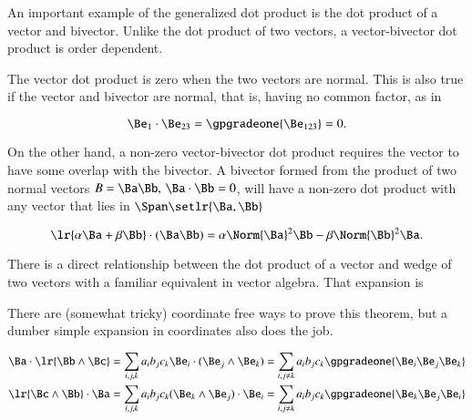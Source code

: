 

An important example of the generalized dot product is the dot product of a vector and bivector.
Unlike the dot product of two vectors, a vector-bivector dot product is order dependent.

The vector dot product is zero when the two vectors are normal.
This is also true if the vector and bivector are normal, that is, having no common factor, as in

\begin{equation}\label{eqn:generalizedDot:661}
\Be_1 \cdot \Be_{23} = \gpgradeone{ \Be_{123} } = 0.
\end{equation}

On the other hand, a non-zero vector-bivector dot product requires the vector to have some overlap with the bivector.
A bivector formed from the product of two normal vectors \( B = \Ba \Bb, \, \Ba \cdot \Bb = 0 \), will have a non-zero dot product with any vector that lies in \( \Span \setlr{ \Ba, \Bb} \)

\begin{dmath}\label{eqn:generalizedDot:681}
\lr{ \alpha \Ba + \beta \Bb } \cdot (\Ba\Bb)
=
\alpha \Norm{\Ba}^2 \Bb - \beta \Norm{\Bb}^2 \Ba.
\end{dmath}

There is a direct relationship between the
dot product of a vector and wedge of two vectors with a familiar equivalent in  vector algebra.
That expansion is


There are (somewhat tricky) coordinate free ways to prove this theorem, but a dumber simple expansion in coordinates also does the job.

\begin{dmath}\label{eqn:gradeselectionProblems:681}
\begin{aligned}
\Ba \cdot \lr{ \Bb \wedge \Bc } &= \sum_{i, j, k} a_i b_j c_k \Be_i \cdot (\Be_j \wedge \Be_k)
= \sum_{i, j \ne k} a_i b_j c_k \gpgradeone{ \Be_i \Be_j \Be_k }
\\
\lr{ \Bc \wedge \Bb } \cdot \Ba &= \sum_{i, j, k} a_i b_j c_k (\Be_k \wedge \Be_j) \cdot \Be_i
= \sum_{i, j \ne k} a_i b_j c_k \gpgradeone{ \Be_k \Be_j \Be_i }
\end{aligned}
\end{dmath}

